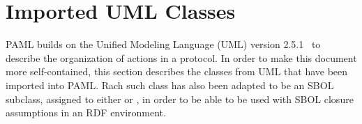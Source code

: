 \section{Imported UML Classes}

PAML builds on the Unified Modeling Language (UML) version 2.5.1~\citep{uml251} to describe the organization of actions in a protocol.
In order to make this document more self-contained, this section describes the classes from UML that have been imported into PAML.
Rach such class has also been adapted to be an SBOL subclass, assigned to either  or , in order to be able to be used with SBOL closure assumptions in an RDF environment.




